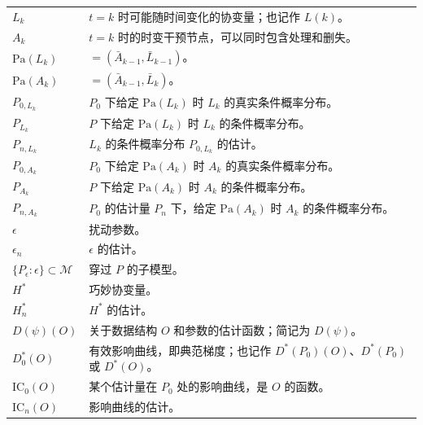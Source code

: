 \begin{longtable}{@{}p{}p{}@{}}
$L_k$ & $t=k$ 时可能随时间变化的协变量；也记作 $L(k)$。 \\
$A_k$ & $t=k$ 时的时变干预节点，可以同时包含处理和删失。 \\
$\mathrm{Pa}(L_k)$ & $=(\bar A_{k-1},\bar L_{k-1})$。 \\
$\mathrm{Pa}(A_k)$ & $=(\bar A_{k-1},\bar L_k)$。 \\
$P_{0,L_k}$ & $P_0$ 下给定 $\mathrm{Pa}(L_k)$ 时 $L_k$ 的真实条件概率分布。 \\
$P_{L_k}$ & $P$ 下给定 $\mathrm{Pa}(L_k)$ 时 $L_k$ 的条件概率分布。 \\
$P_{n,L_k}$ & $L_k$ 的条件概率分布 $P_{0,L_k}$ 的估计。 \\
$P_{0,A_k}$ & $P_0$ 下给定 $\mathrm{Pa}(A_k)$ 时 $A_k$ 的真实条件概率分布。 \\
$P_{A_k}$ & $P$ 下给定 $\mathrm{Pa}(A_k)$ 时 $A_k$ 的条件概率分布。 \\
$P_{n,A_k}$ & $P_0$ 的估计量 $P_n$ 下，给定 $\mathrm{Pa}(A_k)$ 时 $A_k$ 的条件概率分布。 \\
$\epsilon$ & 扰动参数。 \\
$\epsilon_n$ & $\epsilon$ 的估计。 \\
$\{P_\epsilon:\epsilon\}\subset\mathcal M$ & 穿过 $P$ 的子模型。 \\
$H^*$ & 巧妙协变量。 \\
$H_n^*$ & $H^*$ 的估计。 \\
$D(\psi)(O)$ & 关于数据结构 $O$ 和参数的估计函数；简记为 $D(\psi)$。 \\
$D_0^*(O)$ & 有效影响曲线，即典范梯度；也记作 $D^*(P_0)(O)$、$D^*(P_0)$ 或 $D^*(O)$。 \\
$\mathrm{IC}_0(O)$ & 某个估计量在 $P_0$ 处的影响曲线，是 $O$ 的函数。 \\
$\mathrm{IC}_n(O)$ & 影响曲线的估计。 \\
\end{longtable}

